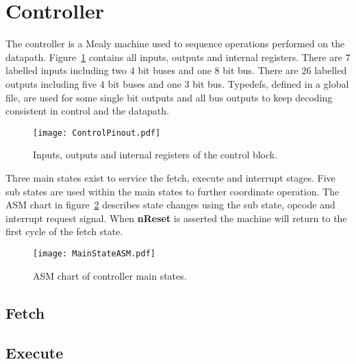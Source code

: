 \section{Controller}

The controller is a Mealy machine used to sequence operations performed on the datapath.
Figure~\ref{fig:ControlBlock} contains all inputs, outputs and internal registers.
There are $7$ labelled inputs including two $4$ bit buses and one $8$ bit bus.
There are $26$ labelled outputs including five $4$ bit buses and one $3$ bit bus.
Typedefs, defined in a global file, are used for some single bit outputs and all bus outputs to keep decoding consistent in control and the datapath. 


\begin{figure}[ht]
   \centering
    \texttt{[image: ControlPinout.pdf]}
		\caption{Inputs, outputs and internal registers of the control block.}%
   \label{fig:ControlBlock}
\end{figure}

Three main states exist to service the fetch, execute and interrupt stages.
Five sub states are used within the main states to further coordinate operation.
The ASM chart in figure~\ref{fig:MainStateASM} describes state changes using the sub state, opcode and interrupt request signal.   
When \textbf{nReset} is asserted the machine will return to the first cycle of the fetch state.


\begin{figure}[ht]
   \centering
    \texttt{[image: MainStateASM.pdf]}
		\caption{ASM chart of controller main states.}%
   \label{fig:MainStateASM}
\end{figure}








\subsection{Fetch}





\subsection{Execute}




